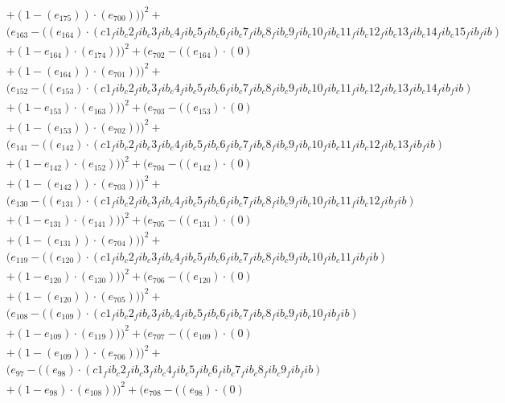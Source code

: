 \documentclass[10pt, a4paper]{article}
\begin{document}
\begin{small}
\begin{align*}
& + (1 - (e_{175})) \cdot (e_{700})))^{2} + \\
& (e_{163} - ((e_{164})  \cdot  (c1_fib_c2_fib_c3_fib_c4_fib_c5_fib_c6_fib_c7_fib_c8_fib_c9_fib_c10_fib_c11_fib_c12_fib_c13_fib_c14_fib_c15_fib_fib) \\
& + (1 - e_{164})  \cdot  (e_{174})))^{2} + (e_{702} - ((e_{164}) \cdot (0) \\
& + (1 - (e_{164})) \cdot (e_{701})))^{2} + \\
& (e_{152} - ((e_{153})  \cdot  (c1_fib_c2_fib_c3_fib_c4_fib_c5_fib_c6_fib_c7_fib_c8_fib_c9_fib_c10_fib_c11_fib_c12_fib_c13_fib_c14_fib_fib) \\
& + (1 - e_{153})  \cdot  (e_{163})))^{2} + (e_{703} - ((e_{153}) \cdot (0) \\
& + (1 - (e_{153})) \cdot (e_{702})))^{2} + \\
& (e_{141} - ((e_{142})  \cdot  (c1_fib_c2_fib_c3_fib_c4_fib_c5_fib_c6_fib_c7_fib_c8_fib_c9_fib_c10_fib_c11_fib_c12_fib_c13_fib_fib) \\
& + (1 - e_{142})  \cdot  (e_{152})))^{2} + (e_{704} - ((e_{142}) \cdot (0) \\
& + (1 - (e_{142})) \cdot (e_{703})))^{2} + \\
& (e_{130} - ((e_{131})  \cdot  (c1_fib_c2_fib_c3_fib_c4_fib_c5_fib_c6_fib_c7_fib_c8_fib_c9_fib_c10_fib_c11_fib_c12_fib_fib) \\
& + (1 - e_{131})  \cdot  (e_{141})))^{2} + (e_{705} - ((e_{131}) \cdot (0) \\
& + (1 - (e_{131})) \cdot (e_{704})))^{2} + \\
& (e_{119} - ((e_{120})  \cdot  (c1_fib_c2_fib_c3_fib_c4_fib_c5_fib_c6_fib_c7_fib_c8_fib_c9_fib_c10_fib_c11_fib_fib) \\
& + (1 - e_{120})  \cdot  (e_{130})))^{2} + (e_{706} - ((e_{120}) \cdot (0) \\
& + (1 - (e_{120})) \cdot (e_{705})))^{2} + \\
& (e_{108} - ((e_{109})  \cdot  (c1_fib_c2_fib_c3_fib_c4_fib_c5_fib_c6_fib_c7_fib_c8_fib_c9_fib_c10_fib_fib) \\
& + (1 - e_{109})  \cdot  (e_{119})))^{2} + (e_{707} - ((e_{109}) \cdot (0) \\
& + (1 - (e_{109})) \cdot (e_{706})))^{2} + \\
& (e_{97} - ((e_{98})  \cdot  (c1_fib_c2_fib_c3_fib_c4_fib_c5_fib_c6_fib_c7_fib_c8_fib_c9_fib_fib) \\
& + (1 - e_{98})  \cdot  (e_{108})))^{2} + (e_{708} - ((e_{98}) \cdot (0) \\

\end{align*}
\end{small}
\end{document}

